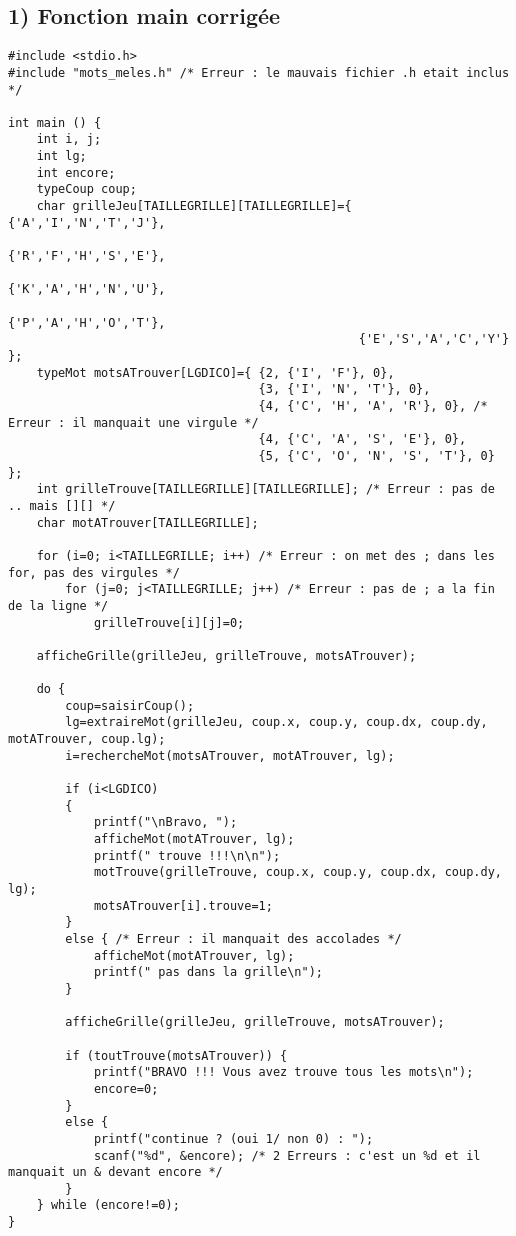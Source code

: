 \documentclass[a4paper,11pt]{article}
\begin{document}
\subsection*{1) Fonction main corrigée}
\begin{lstlisting}[caption=La fonction main corrigée]
#include <stdio.h>
#include "mots_meles.h" /* Erreur : le mauvais fichier .h etait inclus */

int main () {
	int i, j;
	int lg;
	int encore;
	typeCoup coup;
	char grilleJeu[TAILLEGRILLE][TAILLEGRILLE]={ {'A','I','N','T','J'},
												 {'R','F','H','S','E'},
												 {'K','A','H','N','U'},
												 {'P','A','H','O','T'},
												 {'E','S','A','C','Y'} };
	typeMot motsATrouver[LGDICO]={ {2, {'I', 'F'}, 0},
								   {3, {'I', 'N', 'T'}, 0},
								   {4, {'C', 'H', 'A', 'R'}, 0}, /* Erreur : il manquait une virgule */
								   {4, {'C', 'A', 'S', 'E'}, 0},
								   {5, {'C', 'O', 'N', 'S', 'T'}, 0} };
	int grilleTrouve[TAILLEGRILLE][TAILLEGRILLE]; /* Erreur : pas de .. mais [][] */
	char motATrouver[TAILLEGRILLE]; 

	for (i=0; i<TAILLEGRILLE; i++) /* Erreur : on met des ; dans les for, pas des virgules */
		for (j=0; j<TAILLEGRILLE; j++) /* Erreur : pas de ; a la fin de la ligne */
			grilleTrouve[i][j]=0;

	afficheGrille(grilleJeu, grilleTrouve, motsATrouver);
	
	do {
		coup=saisirCoup();
		lg=extraireMot(grilleJeu, coup.x, coup.y, coup.dx, coup.dy, motATrouver, coup.lg);
		i=rechercheMot(motsATrouver, motATrouver, lg);

		if (i<LGDICO)
		{
			printf("\nBravo, ");
			afficheMot(motATrouver, lg);
			printf(" trouve !!!\n\n");
			motTrouve(grilleTrouve, coup.x, coup.y, coup.dx, coup.dy, lg);
			motsATrouver[i].trouve=1;
		}
		else { /* Erreur : il manquait des accolades */
			afficheMot(motATrouver, lg);
			printf(" pas dans la grille\n");
		}

		afficheGrille(grilleJeu, grilleTrouve, motsATrouver);

		if (toutTrouve(motsATrouver)) {
			printf("BRAVO !!! Vous avez trouve tous les mots\n");
			encore=0;
		}
		else { 
			printf("continue ? (oui 1/ non 0) : ");
			scanf("%d", &encore); /* 2 Erreurs : c'est un %d et il manquait un & devant encore */
		}
	} while (encore!=0);
}
\end{lstlisting}

\end{document}
